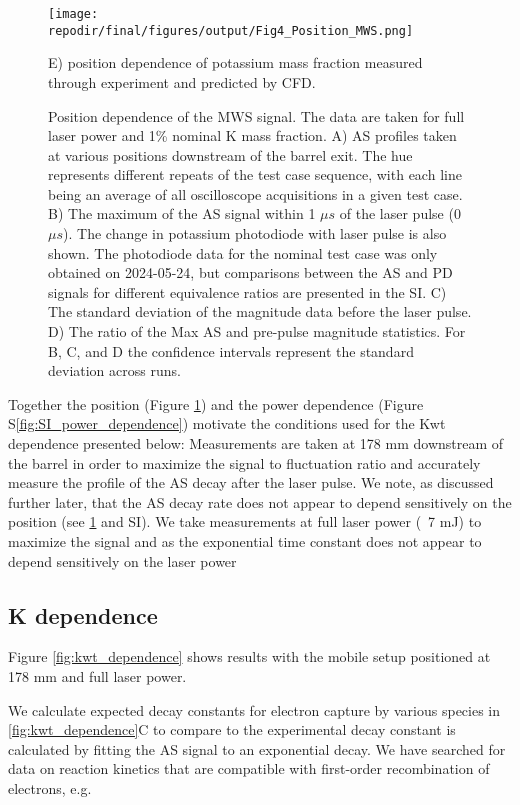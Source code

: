 \begin{figure}[h]
    \texttt{[image: \\repodir/final/figures/output/Fig4\_Position\_MWS.png]} 
    \caption{Position dependence of the MWS signal. The data are taken for full laser power and 1\% nominal K mass fraction. A) AS profiles taken at various positions downstream of the barrel exit. The hue represents different repeats of the test case sequence, with each line being an average of all oscilloscope acquisitions in a given test case. B) The maximum of the AS signal within 1 $\mu s$ of the laser pulse (0 $\mu s$). The change in potassium photodiode with laser pulse is also shown. The photodiode data for the nominal test case was only obtained on 2024-05-24, but comparisons between the AS and PD signals for different equivalence ratios are presented in the SI.   C) The standard deviation of the magnitude data before the laser pulse. D) The ratio of the Max AS and pre-pulse magnitude statistics. For B, C, and D the confidence intervals represent the standard deviation across runs. } E) position dependence of potassium mass fraction measured through experiment and predicted by CFD. 
    \label{fig:pos_dependence_mws}
\end{figure}





Together the position (Figure \ref{fig:pos_dependence_mws}) and the power dependence (Figure S\ref*{fig:SI_power_dependence}) motivate the conditions used for the Kwt dependence presented below: Measurements are taken at 178 mm downstream of the barrel in order to maximize the signal to fluctuation ratio and accurately measure the profile of the AS decay after the laser pulse. We note, as discussed further later, that the AS decay rate does not appear to depend sensitively on the position (see \ref{fig:pos_dependence_mws} and SI). We take measurements at full laser power (~7 mJ) to maximize the signal and as the exponential time constant does not appear to depend sensitively on the laser power

\clearpage

\subsection{K dependence}

Figure \ref{fig:kwt_dependence} shows results with the mobile setup positioned at 178 mm and full laser power. 

We calculate expected decay constants for electron capture by various species in \ref{fig:kwt_dependence}C to compare to the experimental decay constant is calculated by fitting the AS signal to an exponential decay. We have searched for data on reaction kinetics that are compatible with first-order recombination of electrons, e.g.

